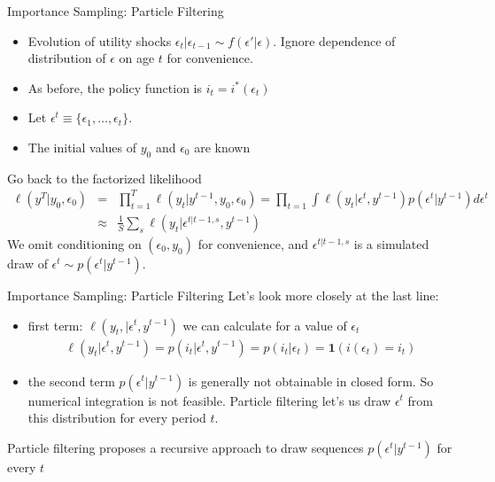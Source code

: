 \begin{frame}{Importance Sampling: Particle Filtering}
\begin{itemize}
\item Evolution of utility shocks $\epsilon_t | \epsilon_{t-1} \sim f(\epsilon' | \epsilon)$. Ignore dependence of distribution of $\epsilon$ on age $t$ for convenience.
\item As before, the policy function is $i_t = i^{*}(\epsilon_t)$
\item Let $\epsilon^t \equiv \{\epsilon_1,\ldots,\epsilon_t\}$.
\item The initial values of $y_0$ and $\epsilon_0$ are known
\end{itemize}
Go back to the factorized likelihood
\begin{eqnarray*}
\ell(y^T | y_0,\epsilon_0 ) &=& \prod_{t=1}^T \ell (y_t | y^{t-1},y_0,\epsilon_0) = \prod_{t=1} \int \ell (y_t |\epsilon^t, y^{t-1}) p(\epsilon^t | y^{t-1} )d \epsilon^t  \\
&\approx& \frac{1}{S} \sum_s \ell(y_t | \epsilon^{t | t-1,s},y^{t-1})
\end{eqnarray*}
We omit conditioning on $(\epsilon_0, y_0)$ for convenience, and $\epsilon^{t | t-1,s}$ is a simulated draw of $\epsilon^t \sim p(\epsilon^t | y^{t-1})$.
\end{frame}



\begin{frame}{Importance Sampling: Particle Filtering}
Let's look more closely at the last line:
\begin{itemize}
\item first term: $\ell(y_t, | \epsilon^t,y^{t-1})$ we can calculate for a value of $\epsilon_t$
\begin{eqnarray*}
\ell(y_t | \epsilon^t , y^{t-1}) = p(i_t | \epsilon^t, y^{t-1}) = p(i_t | \epsilon_t) = \symbf{1}(i(\epsilon_t) = i_t)
\end{eqnarray*}
\item the second term $p(\epsilon^t | y^{t-1})$ is generally not obtainable in closed form. So numerical integration is not feasible. Particle filtering let's us draw $\epsilon^t$ from this distribution for every period $t$.
\end{itemize}
Particle filtering proposes a recursive approach to draw sequences $p(\epsilon^t | y^{t-1})$ for every $t$
\end{frame}


